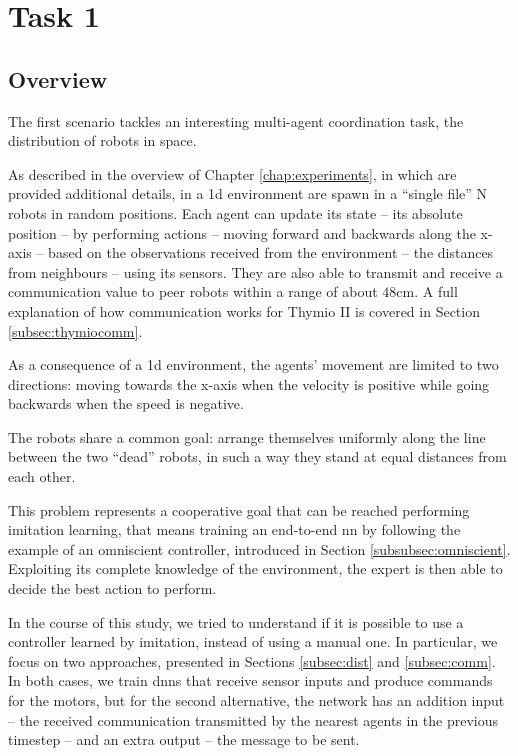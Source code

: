 \section{Task 1}
\label{sec:task1}

\subsection{Overview}
\label{subsec:desc1}

The first scenario tackles an interesting multi-agent coordination task, the 
distribution of robots in space.

As described in the overview of Chapter \ref{chap:experiments}, in which are 
provided additional details, in a \gls{1d} environment are spawn in a ``single 
file'' N robots in random positions. %
Each agent can update its state – its absolute position – by performing actions – 
moving forward and backwards along the x-axis – based on the observations 
received from the environment – the distances from neighbours – using its 
sensors. They are also able to transmit and receive a communication value to 
peer robots within a range of about $48$\gls{cm}. 
A full explanation of how communication works for Thymio II is covered in 
Section \ref{subsec:thymiocomm}.

As a consequence of a \gls{1d} environment, the agents' movement are 
limited to two directions: moving towards the x-axis when the velocity is positive 
while going backwards when the speed is negative. 

The robots share a common goal: arrange themselves uniformly along the 
line between the two ``dead'' robots, in such a way they stand at equal distances 
from each other.


This problem represents a cooperative goal that can be reached performing 
imitation learning, that means training an end-to-end \gls{nn} by following 
the example of an omniscient controller, introduced in Section 
\ref{subsubsec:omniscient}.
Exploiting its complete knowledge of the environment, %
the expert is then able to decide the best action to perform.

In the course of this study, we tried to understand if it is possible to use a 
controller learned by imitation, instead of using a manual one. In particular, we 
focus on two approaches, presented in Sections \ref{subsec:dist} and 
\ref{subsec:comm}.
In both cases, we train \glspl{dnn} that receive sensor inputs and produce 
commands for the motors, but for the second alternative, the network has an 
addition input – the received communication transmitted by the nearest agents in 
the previous timestep – and an extra output – the message to be sent.



